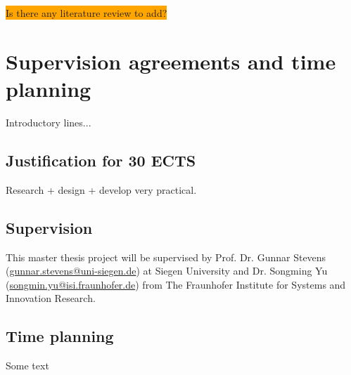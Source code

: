 \colorbox{orange}{Is there any literature review to add?}




\section{Supervision agreements and time planning} 

Introductory lines...


\subsection{Justification for 30 ECTS}

Research + design + develop
very practical. 


\subsection{Supervision}

This master thesis project will be supervised by 
Prof. Dr. Gunnar Stevens (\href{mailto:gunnar.stevens@uni-siegen.de}{gunnar.stevens@uni-siegen.de}) at Siegen University and 
Dr. Songming Yu (\href{mailto:songmin.yu@isi.fraunhofer.de}{songmin.yu@isi.fraunhofer.de}) from The Fraunhofer Institute for Systems and Innovation Research. 


\subsection{Time planning}

Some text \\

